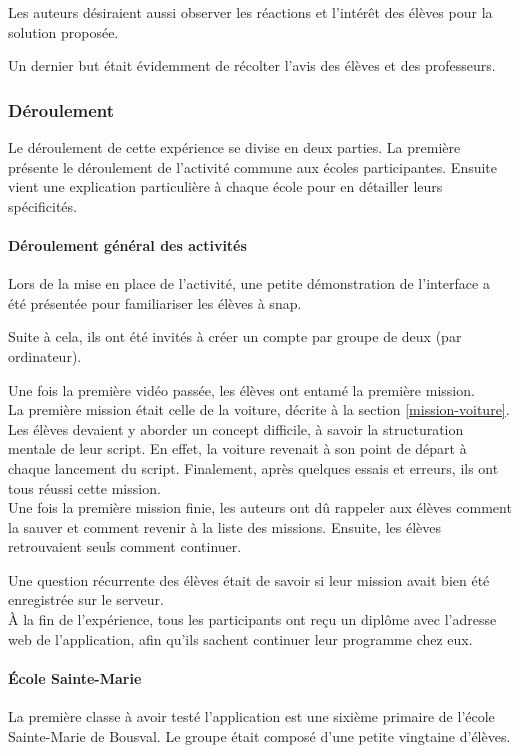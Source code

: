 Les auteurs désiraient aussi observer les réactions et l'intérêt des élèves pour la solution proposée.

Un dernier but était évidemment de récolter l'avis des élèves et des professeurs.

\subsubsection{Déroulement}
Le déroulement de cette expérience se divise en deux parties. La première présente le déroulement de l'activité commune aux écoles participantes. Ensuite vient une explication particulière à chaque école pour en détailler leurs spécificités.
\paragraph{Déroulement général des activités}
Lors de la mise en place de l'activité, une petite démonstration de l'interface a été présentée pour familiariser les élèves à \gls{snap}.

Suite à cela, ils ont été invités à créer un compte par groupe de deux (par ordinateur).

Une fois la première vidéo passée, les élèves ont entamé la première \gls{mission}.\\

La première \gls{mission} était celle de la voiture, décrite à la section \ref{mission-voiture}. Les élèves devaient y aborder un concept difficile, à savoir la structuration mentale de leur \gls{script}. En effet, la voiture revenait à son point de départ à chaque lancement du \gls{script}. Finalement, après quelques essais et erreurs, ils ont tous réussi cette \gls{mission}.\\

Une fois la première \gls{mission} finie, les auteurs ont dû rappeler aux élèves comment la sauver et comment revenir à la liste des \glspl{mission}. Ensuite, les élèves retrouvaient seuls comment continuer.

Une question récurrente des élèves était de savoir si leur \gls{mission} avait bien été enregistrée sur le serveur.\\

À la fin de l'expérience, tous les participants ont reçu un diplôme avec l'adresse web de l'application, afin qu'ils sachent continuer leur programme chez eux.

\paragraph{École Sainte-Marie}
La première classe à avoir testé l'application est une sixième \gls{primaire} de l'école Sainte-Marie de Bousval. Le groupe était composé d'une petite vingtaine d'élèves.

